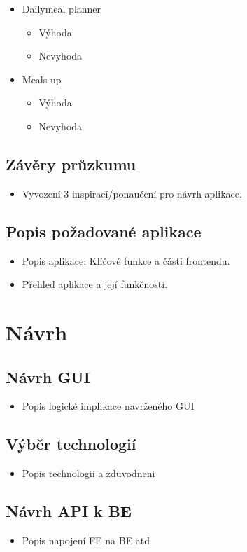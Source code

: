 \documentclass[a4paper,12pt]{article}
\begin{document}
\begin{itemize}
    \item Dailymeal planner
    \begin{itemize}
        \item Výhoda
        \item Nevyhoda
    \end{itemize}
    \item Meals up
    \begin{itemize}
        \item Výhoda
        \item Nevyhoda
    \end{itemize}
    
\end{itemize}


\subsection*{Závěry průzkumu}
\begin{itemize}
    \item Vyvození 3 inspirací/ponaučení pro návrh aplikace.
\end{itemize}

\subsection*{Popis požadované aplikace}
\begin{itemize}
    \item Popis aplikace: Klíčové funkce a části frontendu.
    \item Přehled aplikace a její funkčnosti.
\end{itemize}

\section*{Návrh}
\subsection*{Návrh GUI}
\begin{itemize}
    \item Popis  logické implikace navrženého GUI
\end{itemize}

\subsection*{Výběr technologií}
\begin{itemize}
    \item Popis technologii a zduvodneni
\end{itemize}

\subsection*{Návrh API k BE}
\begin{itemize}
    \item Popis  napojení FE na BE atd
\end{itemize}
\end{document}
